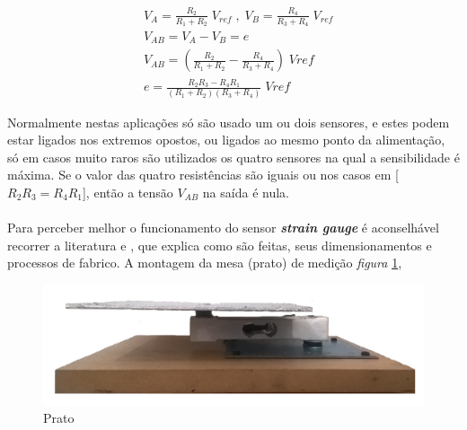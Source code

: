 \begin{minipage}[!b]{.6\linewidth}
	\begin{align}
		\label{eq:wheatstone}
		&V_A =  \frac{R_2}{R_1 + R_2} \; V_{ref} \; , \; V_B=\frac{R_4}{R_3 + R_4} \; V_{ref} \\
		&V_{AB} =  V_A - V_B = e \\
		&V_{AB}= \left(\frac{R_2}{R_1 + R_2} - \frac{R_4}{R_3 + R_4}\right) \; Vref \\
		&e = \frac{R_2 R_3 - R_4 R_1}{(R_1 + R_2)(R_3 + R_4)} \; Vref
	\end{align}
\end{minipage}
Normalmente nestas aplicações só são usado um ou dois sensores, e estes podem estar ligados nos extremos opostos, ou ligados ao mesmo ponto da alimentação, só em casos muito raros são utilizados os quatro sensores na qual a sensibilidade é máxima. Se o valor das quatro resistências são iguais ou nos casos em [$R_2 R_3 = R_4 R_1$], então a tensão $V_{AB}$ na saída é nula.
\\
\\
Para perceber melhor o funcionamento do sensor \textit{\textbf{strain gauge}} é aconselhável recorrer a literatura \cite{book-9} e \cite{book-10}, que explica como são feitas, seus dimensionamentos e processos de fabrico.
\newpage
A montagem da mesa (prato) de medição  \textit{figura} \ref{Prato},
\begin{minipage}[!b]{\linewidth}
\begin{figure}[H]
	\centering
	\includegraphics[scale=0.16]{./image/PESTA/material/Prato.jpg}
	\caption{Prato}
	\label{Prato}
\end{figure}
\end{minipage}
\newpage
